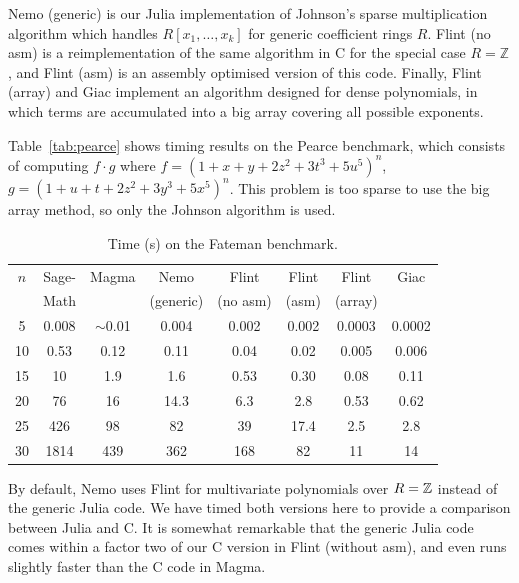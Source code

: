 \documentclass{sig-alternate-05-2015}
\begin{document}
Nemo (generic) is our Julia implementation of Johnson's sparse
multiplication algorithm which handles $R[x_1,\ldots,x_k]$
for generic coefficient rings $R$.
Flint (no asm) is a reimplementation of the same
algorithm in C for the special case $R = \mathbb{Z}$,
and Flint (asm) is an assembly optimised version of this code.
Finally, Flint (array) and Giac implement an algorithm designed
for dense polynomials, in which terms are accumulated
into a big array covering all possible exponents.

Table~\ref{tab:pearce} shows timing results on the Pearce
benchmark, which consists of computing $f \cdot g$ where
$f = (1 + x + y + 2z^2 + 3t^3 + 5u^5)^n$,
$g = (1 + u + t + 2z^2 + 3y^3 + 5x^5)^n$.
This problem is too sparse to use the big array method,
so only the Johnson algorithm is used.

\begin{table}
\center
\caption{Time (s) on the Fateman benchmark.}
\begin{small}
\setlength{\tabcolsep}{2.0pt}
\renewcommand{\arraystretch}{1.08}
\begin{tabular}{c c c c c c c c} \hline
$n$ & Sage- & Magma & Nemo & Flint & Flint & Flint & Giac \\ 
    &   Math    &       & (generic) & (no asm) & (asm) & (array) & \\ \hline
     5  &  0.008 & $\sim$0.01   & 0.004      &        0.002    &        0.002       &      0.0003    &    0.0002 \\
    10  &  0.53  &   0.12  &   0.11     &         0.04    &         0.02       &         0.005   &      0.006 \\
    15  &   10   &    1.9  &      1.6   &         0.53    &          0.30      &           0.08   &         0.11 \\
    20  &   76   &    16   &    14.3    &          6.3    &            2.8     &            0.53   &         0.62 \\
    25  &  426   &   98    &      82    &          39     &         17.4        &           2.5     &         2.8 \\
    30  & 1814   & 439     &  362       &         168     &            82        &            11     &          14 \\
\end{tabular}
\label{tab:fateman}
\end{small}
\end{table}

By default, Nemo uses Flint for multivariate polynomials
over $R = \mathbb{Z}$ instead of the generic
Julia code.
We have timed both versions here
to provide a comparison between Julia and C.
It is somewhat remarkable that the generic Julia code comes
within a factor two of our C version in Flint (without asm),
and even runs slightly faster than the C code in Magma.
\end{document}
